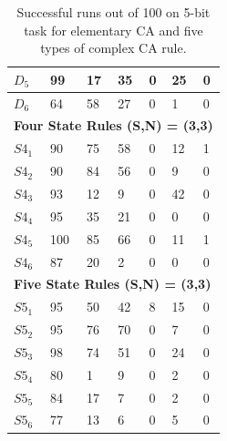 \documentclass{elsarticle}
\begin{document}
\begin{multicols}{2}
\begin{table}[!htb]
\begin{tabular}{|l|l|l|l|l|l|l|}
$D_{5}$ & 99 & 17 & 35 & 0 & 25 & 0 \\ \hline
$D_{6}$ & 64 & 58 & 27 & 0 & 1 & 0 \\ \hline
\multicolumn{7}{|l|}{\textbf{Four State Rules (S,N) = (3,3)}} \\ \hline
$S4_{1}$ & 90 & 75 & 58 & 0 & 12  & 1 \\ \hline
$S4_{2}$ & 90 & 84 & 56 & 0 & 9 & 0  \\ \hline
$S4_{3}$ & 93 & 12 & 9 & 0 & 42 & 0 \\ \hline
$S4_{4}$ & 95 & 35 & 21 & 0 & 0 & 0 \\ \hline
$S4_{5}$ & 100 & 85 & 66 & 0 & 11 & 1 \\ \hline
$S4_{6}$ & 87 & 20 & 2 & 0 & 0 & 0 \\ \hline
\multicolumn{7}{|l|}{\textbf{Five State Rules (S,N) = (3,3)}} \\ \hline
$S5_{1}$ & 95 & 50 & 42 & 8 & 15 & 0 \\ \hline
$S5_{2}$ & 95 & 76 & 70 & 0 & 7 & 0 \\ \hline
$S5_{3}$ & 98 & 74 & 51 & 0 & 24 & 0 \\ \hline
$S5_{4}$ & 80 & 1 & 9 & 0 & 2 & 0 \\ \hline
$S5_{5}$ & 84 & 17 & 7 & 0 & 2 & 0 \\ \hline
$S5_{6}$ & 77 & 13 & 6 & 0 & 5 & 0 \\ \hline
\end{tabular}
\caption{Successful runs out of 100 on 5-bit task for elementary CA and five 
    types of complex CA rule.}
\label{table:results}
\end{table}




\end{multicols}
\end{document}
